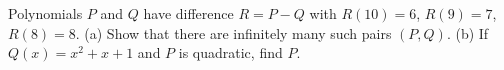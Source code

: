 Polynomials $P$ and $Q$ have difference $R=P-Q$ with $R(10)=6$, $R(9)=7$, $R(8)=8$.
(a) Show that there are infinitely many such pairs $(P,Q)$.
(b) If $Q(x)=x^2+x+1$ and $P$ is quadratic, find $P$.
